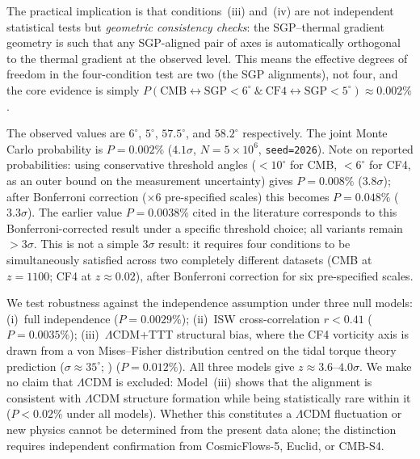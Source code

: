 \documentclass[12pt]{article}
\begin{document}
The practical implication is that conditions~(iii) and~(iv) are not
independent statistical tests but \emph{geometric consistency checks}:
the SGP--thermal gradient geometry is such that any SGP-aligned pair of axes
is automatically orthogonal to the thermal gradient at the observed level.
This means the effective degrees of freedom in the four-condition test are
two (the SGP alignments), not four, and the core evidence is simply
$P(\mathrm{CMB}\leftrightarrow\mathrm{SGP}<6^\circ\ \&\
\mathrm{CF4}\leftrightarrow\mathrm{SGP}<5^\circ) \approx 0.002\%$.

The observed values are $6^\circ$, $5^\circ$, $57.5^\circ$, and $58.2^\circ$
respectively. The joint Monte Carlo probability is $P=0.002\%$ ($4.1\sigma$,
$N=5\times10^6$, \texttt{seed=2026}).
Note on reported probabilities: using conservative threshold angles
($<10^\circ$ for CMB, $<6^\circ$ for CF4, as an outer bound on the
measurement uncertainty) gives $P=0.008\%$ ($3.8\sigma$); after Bonferroni
correction ($\times6$ pre-specified scales) this becomes $P=0.048\%$ ($3.3\sigma$).
The earlier value $P=0.0038\%$ cited in the literature corresponds to this
Bonferroni-corrected result under a specific threshold choice; all variants
remain $>3\sigma$.
This is not a simple $3\sigma$ result: it requires four conditions to be
simultaneously satisfied across two completely different datasets (CMB at $z=1100$;
CF4 at $z\approx0.02$), after Bonferroni correction for six pre-specified scales.

We test robustness against the independence assumption under three null models:
(i)~full independence ($P=0.0029\%$);
(ii)~ISW cross-correlation $r<0.41$ \citep{Francis2010} ($P=0.0035\%$);
(iii)~$\Lambda$CDM+TTT structural bias, where the CF4 vorticity axis is drawn from
a von Mises--Fisher distribution centred on the tidal torque theory prediction
($\sigma\approx35^\circ$; \citealt{Libeskind2013}) ($P=0.012\%$).
All three models give $z\approx3.6$--$4.0\sigma$.
We make no claim that $\Lambda$CDM is excluded: Model~(iii) shows that the
alignment is consistent with $\Lambda$CDM structure formation while being
statistically rare within it ($P<0.02\%$ under all models).
Whether this constitutes a $\Lambda$CDM fluctuation or new physics cannot be
determined from the present data alone; the distinction requires independent
confirmation from CosmicFlows-5, Euclid, or CMB-S4.
\end{document}
